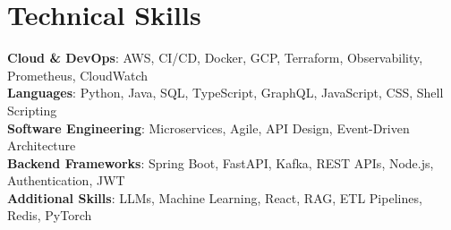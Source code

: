 \documentclass[letterpaper,11pt]{article}
\begin{document}
\section{Technical Skills}
 \begin{itemize}[leftmargin=0.15in, label={}]
    \small{\item{
     \textbf{Cloud \& DevOps}{: AWS, CI/CD, Docker, GCP, Terraform, Observability, Prometheus, CloudWatch} \\
     \textbf{Languages}{: Python, Java, SQL, TypeScript, GraphQL, JavaScript, CSS, Shell Scripting} \\
     \textbf{Software Engineering}{: Microservices, Agile, API Design, Event-Driven Architecture} \\
     \textbf{Backend Frameworks}{: Spring Boot, FastAPI, Kafka, REST APIs, Node.js, Authentication, JWT} \\
     \textbf{Additional Skills}{: LLMs, Machine Learning, React, RAG, ETL Pipelines, Redis, PyTorch} \\
    }}
 \end{itemize}
\end{document}

